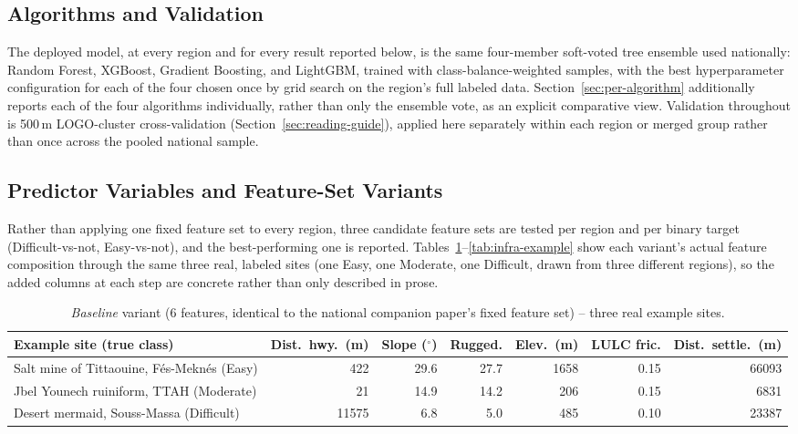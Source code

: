 \documentclass[11pt,a4paper]{article}
\begin{document}
\subsection{Algorithms and Validation}
The deployed model, at every region and for every result reported below, is the same four-member soft-voted tree ensemble used nationally: Random Forest, XGBoost, Gradient Boosting, and LightGBM, trained with class-balance-weighted samples, with the best hyperparameter configuration for each of the four chosen once by grid search on the region's full labeled data. Section~\ref{sec:per-algorithm} additionally reports each of the four algorithms individually, rather than only the ensemble vote, as an explicit comparative view. Validation throughout is 500\,m LOGO-cluster cross-validation (Section~\ref{sec:reading-guide}), applied here separately within each region or merged group rather than once across the pooled national sample.

\subsection{Predictor Variables and Feature-Set Variants}
\label{sec:feature-variants}
Rather than applying one fixed feature set to every region, three candidate feature sets are tested per region and per binary target (Difficult-vs-not, Easy-vs-not), and the best-performing one is reported. Tables~\ref{tab:baseline-example}--\ref{tab:infra-example} show each variant's actual feature composition through the same three real, labeled sites (one Easy, one Moderate, one Difficult, drawn from three different regions), so the added columns at each step are concrete rather than only described in prose.

\begin{table}[H]
\centering\footnotesize
\caption{\emph{Baseline} variant (6 features, identical to the national companion paper's fixed feature set) -- three real example sites.}
\label{tab:baseline-example}
\begin{tabular}{@{}p{3.4cm}rrrrrr@{}}
\toprule
Example site (true class) & Dist.\ hwy.\ (m) & Slope ($^\circ$) & Rugged. & Elev.\ (m) & LULC fric. & Dist.\ settle.\ (m) \\
\midrule
Salt mine of Tittaouine, Fés-Meknés (Easy) & 422 & 29.6 & 27.7 & 1658 & 0.15 & 66093 \\
Jbel Younech ruiniform, TTAH (Moderate) & 21 & 14.9 & 14.2 & 206 & 0.15 & 6831 \\
Desert mermaid, Souss-Massa (Difficult) & 11575 & 6.8 & 5.0 & 485 & 0.10 & 23387 \\
\bottomrule
\end{tabular}
\end{table}
\end{document}
